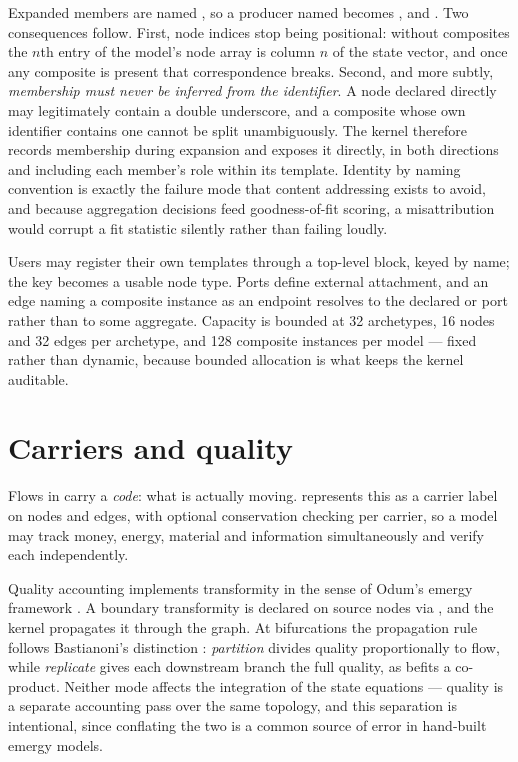 \documentclass[11pt,a4paper]{article}
\begin{document}
Expanded members are named , so a producer named  becomes ,  and . Two consequences follow. First, node indices stop being positional: without composites the $n$th entry of the model's node array is column $n$ of the state vector, and once any composite is present that correspondence breaks. Second, and more subtly, \emph{membership must never be inferred from the identifier}. A node declared directly may legitimately contain a double underscore, and a composite whose own identifier contains one cannot be split unambiguously. The kernel therefore records membership during expansion and exposes it directly, in both directions and including each member's role within its template. Identity by naming convention is exactly the failure mode that content addressing exists to avoid, and because aggregation decisions feed goodness-of-fit scoring, a misattribution would corrupt a fit statistic silently rather than failing loudly.

Users may register their own templates through a top-level  block, keyed by name; the key becomes a usable node type. Ports define external attachment, and an edge naming a composite instance as an endpoint resolves to the declared  or  port rather than to some aggregate. Capacity is bounded at 32 archetypes, 16 nodes and 32 edges per archetype, and 128 composite instances per model --- fixed rather than dynamic, because bounded allocation is what keeps the kernel auditable.

\section{Carriers and quality}

Flows in \esl{} carry a \emph{code}: what is actually moving. \gssk{} represents this as a carrier label on nodes and edges, with optional conservation checking per carrier, so a model may track money, energy, material and information simultaneously and verify each independently.

Quality accounting implements transformity in the sense of Odum's emergy framework \citep{odum1996}. A boundary transformity is declared on source nodes via , and the kernel propagates it through the graph. At bifurcations the propagation rule follows Bastianoni's distinction \citep{bastianoni2011}: \emph{partition} divides quality proportionally to flow, while \emph{replicate} gives each downstream branch the full quality, as befits a co-product. Neither mode affects the integration of the state equations --- quality is a separate accounting pass over the same topology, and this separation is intentional, since conflating the two is a common source of error in hand-built emergy models.
\end{document}
